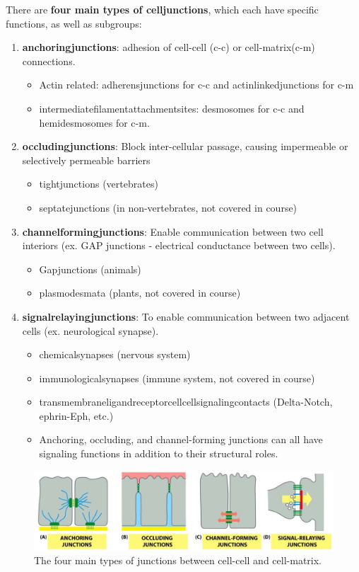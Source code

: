 \documentclass[../main.tex]{subfiles}
\begin{document}
There are \textbf{four main types of \gls{celljunctions}}, which each have specific functions, as well as subgroups:
\begin{enumerate}
	\item \textbf{\gls{anchoringjunctions}}: adhesion of cell-cell (c-c) or cell-matrix(c-m) connections.
	\begin{itemize}
		\item Actin related: \gls{adherensjunctions} for c-c and \gls{actinlinkedjunctions} for c-m
		\item \gls{intermediatefilamentattachmentsites}: \gls{desmosomes} for c-c and \gls{hemidesmosomes} for c-m.
	\end{itemize}
	\item \textbf{\gls{occludingjunctions}}: Block inter-cellular passage, causing impermeable or selectively permeable barriers
	\begin{itemize}
		\item \gls{tightjunctions} (vertebrates)
		\item \gls{septatejunctions} (in non-vertebrates, not covered in course)
	\end{itemize}
	\item \textbf{\gls{channelformingjunctions}}: Enable communication between two cell interiors (ex. GAP junctions - electrical conductance between two cells).
	\begin{itemize}
		\item \gls{Gapjunctions} (animals)
		\item \gls{plasmodesmata} (plants, not covered in course)
	\end{itemize}
	\item \textbf{\gls{signalrelayingjunctions}}: To enable communication between two adjacent cells (ex. neurological synapse).
	\begin{itemize}
		\item \gls{chemicalsynapses} (nervous system)
		\item \gls{immunologicalsynapses} (immune system, not covered in course)
		\item \gls{transmembraneligandreceptorcellcellsignalingcontacts} (Delta-Notch, ephrin-Eph, etc.) 
		\item Anchoring, occluding, and channel-forming junctions can all have signaling functions in addition to their structural roles.
	\end{itemize}
\end{enumerate}

\begin{figure}[H]
	\centering
	\includegraphics[width=0.7\linewidth]{junct_types}
	\caption{The four main types of junctions between cell-cell and cell-matrix.}
	\label{fig:juncttypes}
\end{figure}
\end{document}
